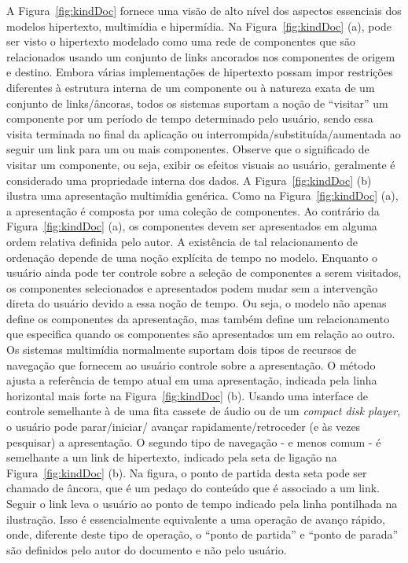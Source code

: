 A Figura~\ref{fig:kindDoc} fornece uma visão de alto nível dos aspectos essenciais dos modelos hipertexto, multimídia e hipermídia. Na Figura~\ref{fig:kindDoc} (a), pode ser visto o hipertexto modelado como uma rede de componentes que são relacionados usando um conjunto de links ancorados nos componentes de origem e destino. Embora várias implementações de hipertexto possam impor restrições diferentes à estrutura interna de um componente ou à natureza exata de um conjunto de links/âncoras, todos os sistemas suportam a noção de “visitar” um componente por um período de tempo determinado pelo usuário, sendo essa visita terminada no final da aplicação ou interrompida/substituída/aumentada ao seguir um link para um ou mais componentes. Observe que o significado de visitar um componente, ou seja, exibir os efeitos visuais ao usuário, geralmente é considerado uma propriedade interna dos dados. A Figura~\ref{fig:kindDoc} (b) ilustra uma apresentação multimídia genérica. Como na Figura~\ref{fig:kindDoc} (a), a apresentação é composta por uma coleção de componentes. Ao contrário da Figura~\ref{fig:kindDoc} (a), os componentes devem ser apresentados em alguma ordem relativa definida pelo autor. A existência de tal relacionamento de ordenação depende de uma noção explícita de tempo no modelo. Enquanto o usuário ainda pode ter controle sobre a seleção de componentes a serem visitados, os componentes selecionados e apresentados podem mudar sem a intervenção direta do usuário devido a essa noção de tempo. Ou seja, o modelo não apenas define os componentes da apresentação, mas também define um relacionamento que especifica quando os componentes são apresentados um em relação ao outro. Os sistemas multimídia normalmente suportam dois tipos de recursos de navegação que fornecem ao usuário controle sobre a apresentação. O método ajusta a referência de tempo atual em uma apresentação, indicada pela linha horizontal mais forte na Figura~\ref{fig:kindDoc} (b). Usando uma interface de controle semelhante à de uma fita cassete de áudio ou de um \textit{compact disk player}, o usuário pode parar/iniciar/ avançar rapidamente/retroceder (e às vezes pesquisar) a apresentação. O segundo tipo de navegação - e menos comum - é semelhante a um link de hipertexto, indicado pela seta de ligação na Figura~\ref{fig:kindDoc} (b). Na figura, o ponto de partida desta seta pode ser chamado de âncora, que é um pedaço do conteúdo que é associado a um link. Seguir o link leva o usuário ao ponto de tempo indicado pela linha pontilhada na ilustração. Isso é essencialmente equivalente a uma operação de avanço rápido, onde, diferente deste tipo de operação, o ``ponto de partida'' e ``ponto de parada'' são definidos pelo autor do documento e não pelo usuário.

